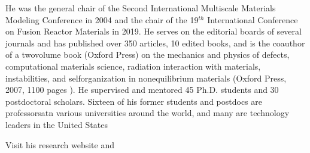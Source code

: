 \documentclass[letterpaper,10pt,english]{jupyterBook}
\begin{document}
\sphinxAtStartPar
He was the general chair of the Second International Multiscale
Materials Modeling Conference in 2004 and the chair of the 19\(^{th}\)
International Conference on Fusion Reactor Materials in 2019. He serves
on the editorial boards of several journals and has published over 350
articles, 10 edited books, and is the co\sphinxhyphen{}author of a two\sphinxhyphen{}volume book
(Oxford Press) on the mechanics and physics of defects, computational
materials science, radiation interaction with materials, instabilities,
and self\sphinxhyphen{}organization in non\sphinxhyphen{}equilibrium materials (Oxford Press, 2007,
1100 pages \sphinxhyphen{} ). He supervised and mentored 45 Ph.D. students and 30
postdoctoral scholars. Sixteen of his former students and postdocs are professorsatn various universities around the world, and many are technology leaders in the United States

\sphinxAtStartPar
Visit his research website  and 
\end{document}
